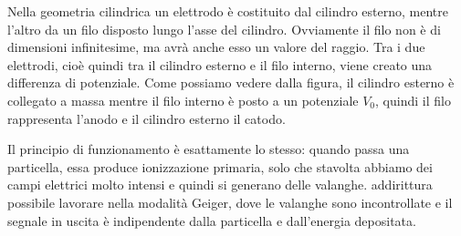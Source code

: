 Nella geometria cilindrica un elettrodo è costituito dal cilindro esterno, mentre l'altro da un filo disposto lungo l'asse del cilindro. Ovviamente il filo non è di dimensioni infinitesime, ma avrà anche esso un valore del raggio. Tra i due elettrodi, cioè quindi tra il cilindro esterno e il filo interno, viene creato una differenza di potenziale. Come possiamo vedere dalla figura, il cilindro esterno è collegato a massa mentre il filo interno è posto a un potenziale $V_0$, quindi il filo rappresenta l'anodo e il cilindro esterno il catodo.

Il principio di funzionamento è esattamente lo stesso: quando passa una particella, essa produce ionizzazione primaria, solo che stavolta abbiamo dei campi elettrici molto intensi e quindi si generano delle valanghe. \E addirittura possibile lavorare nella modalità Geiger, dove le valanghe sono incontrollate e il segnale in uscita è indipendente dalla particella e dall'energia depositata.

